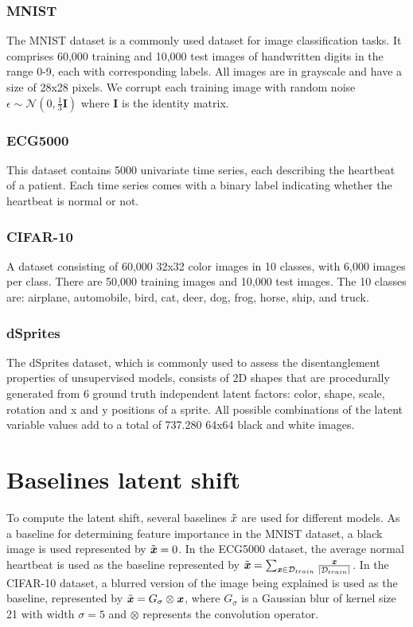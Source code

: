 \subsubsection{MNIST} The MNIST dataset is a commonly used dataset for image classification tasks. It comprises 60,000 training and 10,000 test images of handwritten digits in the range 0-9, each with corresponding labels. All images are in grayscale and have a size of 28x28 pixels. We corrupt each
training image with random noise $\epsilon \sim \mathcal{N}(0,\frac{1}{3} \textbf{I})$ where $\mathbf{I}$ is the identity matrix. %


\subsubsection{ECG5000} This dataset contains 5000 univariate time series, each describing the heartbeat of a patient. Each time series comes with a binary label indicating whether the heartbeat is normal or not. %


\subsubsection{CIFAR-10} A dataset consisting of 60,000 32x32 color images in 10 classes, with 6,000 images per class. There are 50,000 training images and 10,000 test images. The 10 classes are: airplane, automobile, bird, cat, deer, dog, frog, horse, ship, and truck. 

\subsubsection{dSprites} The dSprites dataset, which is commonly used to assess the disentanglement properties of unsupervised models, consists of 2D shapes that are procedurally generated from 6 ground truth independent latent factors: color, shape, scale, rotation and x and y positions of a sprite. All possible combinations of the latent variable values add to a total of 737.280 64x64 black and white images. 

\section{Baselines latent shift}
\label{app:baselines_latent}
To compute the latent shift, several baselines $\Tilde{x}$ are used for different models. As a baseline for determining feature importance in the MNIST dataset, a black image is used represented by $\Tilde{\textbf{\textit{x}}} = 0$. In the ECG5000 dataset, the average normal heartbeat is used as the baseline represented by $\Tilde{\textbf{\textit{x}}} = \sum_{\textbf{\textit{x}} \in \mathcal{D}_{train}} \frac{\textbf{\textit{x}}}{|\mathcal{D}_{train}|}$. In the CIFAR-10 dataset, a blurred version of the image being explained is used as the baseline, represented by $\Tilde{\textbf{\textit{x}}}=  G_{\sigma} \otimes \textbf{\textit{x}}$, where $G_{\sigma}$ is a Gaussian blur of kernel size 21 with width $\sigma = 5$ and $\otimes$ represents the convolution operator.

